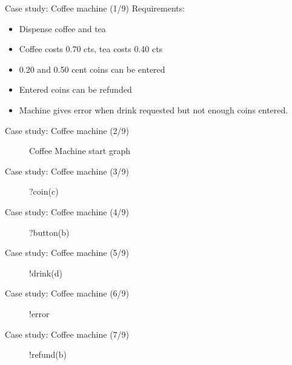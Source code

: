 \documentclass{FMTslides}
\begin{document}
\begin{frame}{Case study: Coffee machine (1/9)}
Requirements:
\begin{itemize}[<+->]
\item Dispense coffee and tea
\item Coffee costs 0.70 cts, tea costs 0.40 cts
\item 0.20 and 0.50 cent coins can be entered
\item Entered coins can be refunded
\item Machine gives error when drink requested but not enough coins entered.
\end{itemize}
\end{frame}

\begin{frame}{Case study: Coffee machine (2/9)}
\begin{figure}
\centering

\caption*{Coffee Machine start graph}
\end{figure}
\end{frame}

\begin{frame}{Case study: Coffee machine (3/9)}
\begin{figure}
\centering

\caption*{?coin(c)}
\end{figure}
\end{frame}

\begin{frame}{Case study: Coffee machine (4/9)}
\begin{figure}
\centering

\caption*{?button(b)}
\end{figure}
\end{frame}

\begin{frame}{Case study: Coffee machine (5/9)}
\begin{figure}
\centering

\caption*{!drink(d)}
\end{figure}
\end{frame}

\begin{frame}{Case study: Coffee machine (6/9)}
\begin{figure}
\centering

\caption*{!error}
\end{figure}
\end{frame}

\begin{frame}{Case study: Coffee machine (7/9)}
\begin{figure}
\centering

\caption*{!refund(b)}
\end{figure}
\end{frame}
\end{document}
